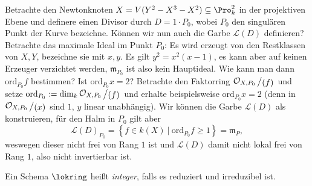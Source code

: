 \documentclass[11pt]{book}
\theoremstyle{nonumberbreak}
\newenvironment{defin}[1][]{\ifthenelse{\equal{#1}{}}{\definition}{\definition[#1]}\rm}{\enddefinition}
\newenvironment{ex}[1][]{\ifthenelse{\equal{#1}{}}{\example}{\example[#1]}\rm}{\endexample}
\newcommand{\slant}[2]{{\raisebox{.1em}{$#1$}\left/\raisebox{-.1em}{$#2$}\right.}}
\begin{document}
\begin{spacing}{1.4}
\begin{ex}
Betrachte den Newtonknoten $X= V(Y^2-X^3-X^2) \subseteq \Pro^2_k$ in der projektiven Ebene und definere einen Divisor durch $D= 1 \cdot P_0$, wobei $P_0$ den singulären Punkt der Kurve bezeichne. Können wir nun auch die Garbe $\mathcal{L}(D)$ definieren? Betrachte das maximale Ideal im Punkt $P_0$: Es wird erzeugt von den Restklassen von $X,Y$, bezeichne sie mit $x,y$. Es gilt $y^2=x^2(x-1)$, es kann aber auf keinen Erzeuger verzichtet werden, $\mathfrak{m}_{P_0}$ ist also kein Hauptideal. Wie kann man dann $\mathrm{ord}_{P_0} f$ bestimmen? Ist $\mathrm{ord}_{P_0} x=2$? Betrachte den Faktorring $\slant{\mathcal{O}_{X,P_0}}{(f)}$ und setze $\mathrm{ord}_{P_0} := \dim_k \slant{\mathcal{O}_{X,P_0}}{(f)}$ und erhalte beispielsweise $\mathrm{ord}_{P_0} x = 2$ (denn in $\slant{\mathcal{O}_{X,P_0}}{(x)}$ sind $1$, $y$ linear unabhängig). Wir können die Garbe $\mathcal{L}(D)$ als konstruieren, für den Halm in $P_0$ gilt aber
$$\mathcal{L}(D)_{P_0} = \left\{f \in k(X) \ \vert \ \mathrm{ord}_{P_0} f \geqslant 1 \right\} = \mathfrak{m}_P,$$
weswegen dieser nicht frei von Rang $1$ ist und $\mathcal{L}(D)$ damit nicht lokal frei von Rang $1$, also nicht invertierbar ist.

\end{ex}



\begin{defin}
Ein Schema $\lokring$ heißt \textit{integer}, falls es reduziert und irreduzibel ist.
\end{defin}



\end{spacing}
\end{document}
